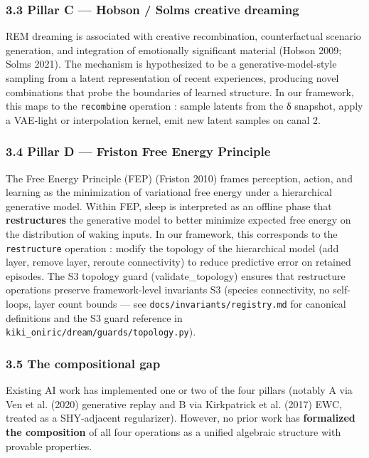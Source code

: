\documentclass[
]{article}
\begin{document}
\subsubsection{3.3 Pillar C --- Hobson / Solms creative
dreaming}\label{pillar-c-hobson-solms-creative-dreaming}

REM dreaming is associated with creative recombination, counterfactual
scenario generation, and integration of emotionally significant material
(Hobson 2009; Solms 2021). The mechanism is hypothesized to be a
generative-model-style sampling from a latent representation of recent
experiences, producing novel combinations that probe the boundaries of
learned structure. In our framework, this maps to the \texttt{recombine}
operation : sample latents from the δ snapshot, apply a VAE-light or
interpolation kernel, emit new latent samples on canal 2.

\subsubsection{3.4 Pillar D --- Friston Free Energy
Principle}\label{pillar-d-friston-free-energy-principle}

The Free Energy Principle (FEP) (Friston 2010) frames perception,
action, and learning as the minimization of variational free energy
under a hierarchical generative model. Within FEP, sleep is interpreted
as an offline phase that \textbf{restructures} the generative model to
better minimize expected free energy on the distribution of waking
inputs. In our framework, this corresponds to the \texttt{restructure}
operation : modify the topology of the hierarchical model (add layer,
remove layer, reroute connectivity) to reduce predictive error on
retained episodes. The S3 topology guard (validate\_topology) ensures
that restructure operations preserve framework-level invariants S3
(species connectivity, no self-loops, layer count bounds --- see
\texttt{docs/invariants/registry.md} for canonical definitions and the
S3 guard reference in \texttt{kiki\_oniric/dream/guards/topology.py}).

\subsubsection{3.5 The compositional gap}\label{the-compositional-gap-1}

Existing AI work has implemented one or two of the four pillars (notably
A via Ven et al. (2020) generative replay and B via {Kirkpatrick et al.}
(2017) EWC, treated as a SHY-adjacent regularizer). However, no prior
work has \textbf{formalized the composition} of all four operations as a
unified algebraic structure with provable properties.
\end{document}
